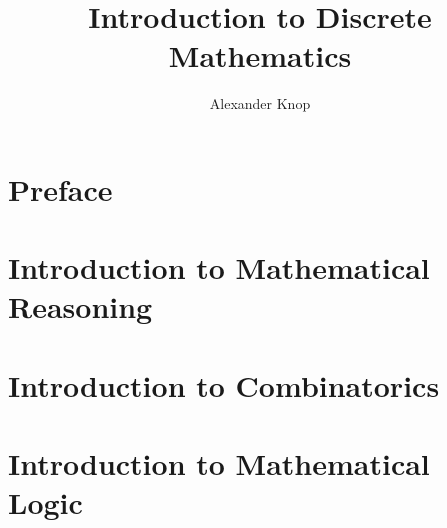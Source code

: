 

\title{\textbf{\Huge Introduction to Discrete Mathematics}}
\author{Alexander Knop}


  \maketitle

  \frontmatter
  \part*{Preface}
  
  \tableofcontents

  \mainmatter

  \part{Introduction to Mathematical Reasoning}
  
  
  
  
  
  
  
  \part{Introduction to Combinatorics}
  
  
  
  
  \part{Introduction to Mathematical Logic}
  

